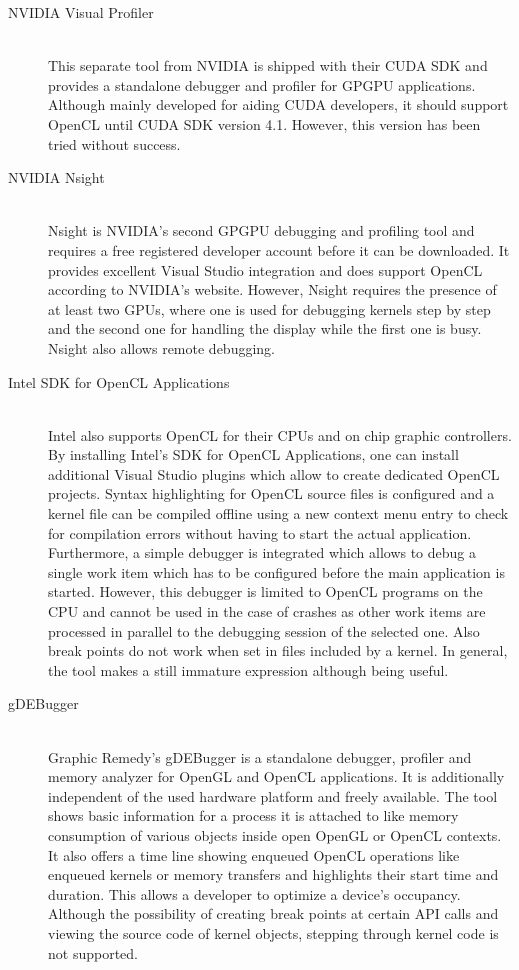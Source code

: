 \begin{description}
\item[NVIDIA Visual Profiler] \hfill \\
This separate tool from NVIDIA is shipped with their CUDA SDK and provides a standalone debugger and profiler for GPGPU applications. Although mainly developed for aiding CUDA developers, it should support OpenCL until CUDA SDK version 4.1. However, this version has been tried without success.

\item[NVIDIA Nsight] \hfill \\
Nsight is NVIDIA's second GPGPU debugging and profiling tool and requires a free registered developer account before it can be downloaded. It provides excellent Visual Studio integration and does support OpenCL according to NVIDIA's website. However, Nsight requires the presence of at least two GPUs, where one is used for debugging kernels step by step and the second one for handling the display while the first one is busy. Nsight also allows remote debugging.

\item[Intel SDK for OpenCL Applications] \hfill \\
Intel also supports OpenCL for their CPUs and on chip graphic controllers. By installing Intel's SDK for OpenCL Applications, one can install additional Visual Studio plugins which allow to create dedicated OpenCL projects. Syntax highlighting for OpenCL source files is configured and a kernel file can be compiled offline using a new context menu entry to check for compilation errors without having to start the actual application. Furthermore, a simple debugger is integrated which allows to debug a single work item which has to be configured before the main application is started. However, this debugger is limited to OpenCL programs on the CPU and cannot be used in the case of crashes as other work items are processed in parallel to the debugging session of the selected one. Also break points do not work when set in files included by a kernel. In general, the tool makes a still immature expression although being useful.

\item[gDEBugger] \hfill \\
Graphic Remedy's gDEBugger is a standalone debugger, profiler and memory analyzer for OpenGL and OpenCL applications. It is additionally independent of the used hardware platform and freely available. The tool shows basic information for a process it is attached to like memory consumption of various objects inside open OpenGL or OpenCL contexts. It also offers a time line showing enqueued OpenCL operations like enqueued kernels or memory transfers and highlights their start time and duration. This allows a developer to optimize a device's occupancy. Although the possibility of creating break points at certain API calls and viewing the source code of kernel objects, stepping through kernel code is not supported.


\end{description}
